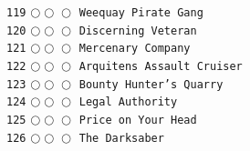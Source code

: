 \documentclass[a4paper,landscape]{article}
\begin{document}
\begin{multicols*}{5}
\texttt{119} \(\bigcirc\!\bigcirc\!\bigcirc\)  \texttt{Weequay Pirate Gang} \vspace{-0.3mm}\\ 
\texttt{120} \(\bigcirc\!\bigcirc\!\bigcirc\)  \texttt{Discerning Veteran} \vspace{-0.3mm}\\ 
\texttt{121} \(\bigcirc\!\bigcirc\!\bigcirc\)  \texttt{Mercenary Company} \vspace{-0.3mm}\\ 
\texttt{122} \(\bigcirc\!\bigcirc\!\bigcirc\)  \texttt{Arquitens Assault Cruiser} \vspace{-0.3mm}\\ 
\texttt{123} \(\bigcirc\!\bigcirc\!\bigcirc\)  \texttt{Bounty Hunter’s Quarry} \vspace{-0.3mm}\\ 
\texttt{124} \(\bigcirc\!\bigcirc\!\bigcirc\)  \texttt{Legal Authority} \vspace{-0.3mm}\\ 
\texttt{125} \(\bigcirc\!\bigcirc\!\bigcirc\)  \texttt{Price on Your Head} \vspace{-0.3mm}\\ 
\texttt{126} \(\bigcirc\!\bigcirc\!\bigcirc\)  \texttt{The Darksaber} \vspace{-0.3mm}\\ 

\end{multicols*}
\end{document}
